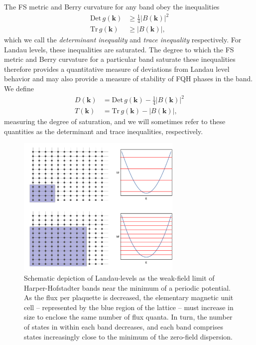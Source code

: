 \documentclass[aps,prb,twocolumn,letterpaper,twoside,nobalancelastpage,groupedaddress,amsmath,amssymb,floatfix,citeautoscript]{revtex4-1}
\begin{document}
The FS metric and Berry curvature for any band obey the inequalities\cite{roy_band_2014}
\begin{align*}
\text{Det}\,g(\mathbf{k})&\geq\frac{1}{4}|B(\mathbf{k})|^2\\
\text{Tr}\,g(\mathbf{k})&\geq|B(\mathbf{k})|,
\end{align*}
which we call the \textit{determinant inequality} and \textit{trace inequality} respectively. For Landau levels, these inequalities are saturated. The degree to which the FS metric and Berry curvature for a particular band saturate these inequalities therefore provides a quantitative measure of deviations from Landau level behavior and may also provide a measure of stability of FQH phases in the band. We define
\begin{align*}
D(\mathbf{k}) &= \text{Det}\,g(\mathbf{k})-\frac{1}{4}|B(\mathbf{k})|^2\\
T(\mathbf{k}) &=\text{Tr}\,g(\mathbf{k})-|B(\mathbf{k})|,
\end{align*}
measuring the degree of saturation, and we will sometimes refer to these quantities as the determinant and trace inequalities, respectively.

\begin{figure}[thb]
\centering
\includegraphics[width=3.1in]{unit-cell-dispersion-grid.pdf}
\caption{\label{bands-schematic}Schematic depiction of Landau-levels as the weak-field limit of Harper-Hofstadter bands near the minimum of a periodic potential. As the flux per plaquette is decreased, the elementary magnetic unit cell -- represented by the blue region of the lattice -- must increase in size to enclose the same number of flux quanta. In turn, the number of states in within each band decreases, and each band comprises states increasingly close to the minimum of the zero-field dispersion.}
\end{figure}
\end{document}
